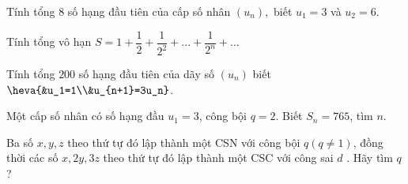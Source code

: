 \begin{vd}%
	Tính tổng $8$ số hạng đầu tiên của cấp số nhân $(u_n),$ biết $u_1=3$ và $u_2=6$. 
\end{vd}

\begin{vd}%
	Tính tổng vô hạn $S=1+\dfrac{1}{2}+\dfrac{1}{2^2}+...+\dfrac{1}{2^n}+...$ 
\end{vd}

\begin{vd}%
	Tính tổng $200$ số hạng đầu tiên của dãy số $(u_n)$ biết $\heva{&u_1=1\\&u_{n+1}=3u_n}$.
\end{vd}

\begin{vd}%
	Một cấp số nhân có số hạng đầu $u_1=3$, công bội $q=2$. Biết $S_n=765$, tìm $n$. 
\end{vd}

\begin{vd}%
	Ba số $x, y, z$ theo thứ tự đó lập thành một CSN với công bội $q (q\ne 1)$, đồng thời các số $x, 2y, 3z$ theo thứ tự đó lập thành một CSC với công sai $d$ . Hãy tìm $q$?
\end{vd}

